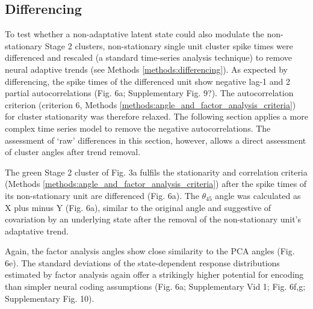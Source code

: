 \documentclass{article}
\begin{document}
\subsection*{Differencing}

To test whether a non-adaptative latent state could also modulate the non-stationary Stage 2 clusters, non-stationary single unit cluster spike times were differenced and rescaled (a standard time-series analysis technique) to remove neural adaptive trends (see Methods \ref{methods:differencing}).
As expected by differencing, the spike times of the differenced unit show negative lag-1 and 2 partial autocorrelations (Fig. 6a; Supplementary Fig. 9?). 
The autocorrelation criterion (criterion 6, Methods \ref{methods:angle_and_factor_analysis_criteria}) for cluster stationarity was therefore relaxed. The following section applies a more complex time series model to remove the negative autocorrelations. The assessment of `raw' differences in this section, however, allows a direct assessment of cluster angles after trend removal. 


The green Stage 2 cluster of Fig. 3a fulfils the stationarity and correlation criteria (Methods \ref{methods:angle_and_factor_analysis_criteria}) after the spike times of its non-stationary unit are differenced (Fig. 6a). The $\theta_{45}$ angle was calculated as X plus minus Y (Fig. 6a), similar to the original angle and suggestive of covariation by an underlying state after the removal of the non-stationary unit's adaptative trend.






Again, the factor analysis angles show close similarity to the PCA angles (Fig. 6e).
The standard deviations of the state-dependent response distributions estimated by factor analysis again offer a strikingly higher potential for encoding than simpler neural coding assumptions (Fig. 6a; Supplementary Vid 1; Fig. 6f,g; Supplementary Fig. 10).
\end{document}

